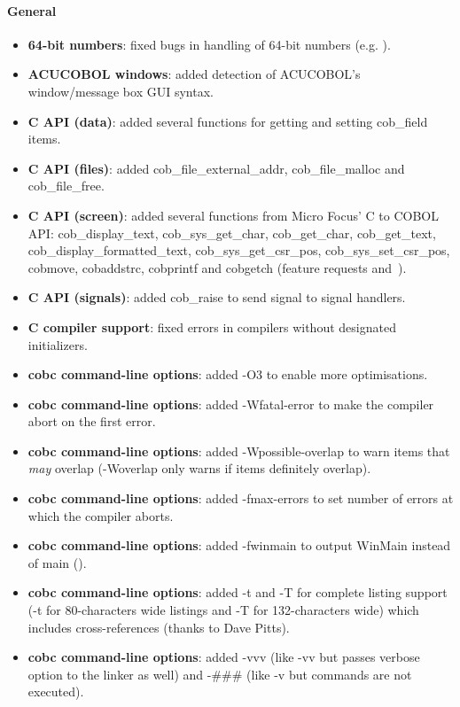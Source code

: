 \paragraph{General}
\begin{itemize}
\item \textbf{64-bit numbers}: fixed bugs in handling of 64-bit numbers (e.g. ).
\item \textbf{ACUCOBOL windows}: added detection of ACUCOBOL's window\slash{}message box GUI syntax.
\item \textbf{C API (data)}: added several functions for getting and setting cob\_field items.
\item \textbf{C API (files)}: added cob\_file\_external\_addr, cob\_file\_malloc and cob\_file\_free.
\item \textbf{C API (screen)}: added several functions from Micro Focus' C to COBOL API: cob\_display\_text, cob\_sys\_get\_char, cob\_get\_char, cob\_get\_text, cob\_display\_formatted\_text, cob\_sys\_get\_csr\_pos, cob\_sys\_set\_csr\_pos, cobmove, cobaddstrc, cobprintf and cobgetch (feature requests  and~).
\item \textbf{C API (signals)}: added cob\_raise to send signal to signal handlers.
\item \textbf{C compiler support}: fixed errors in compilers without designated initializers.
\item \textbf{cobc command-line options}: added -O3 to enable more optimisations.
\item \textbf{cobc command-line options}: added -Wfatal-error to make the compiler abort on the first error.
\item \textbf{cobc command-line options}: added -Wpossible-overlap to warn items that \emph{may} overlap (-Woverlap only warns if items definitely overlap).
\item \textbf{cobc command-line options}: added -fmax-errors to set number of errors at which the compiler aborts.
\item \textbf{cobc command-line options}: added -fwinmain to output WinMain instead of main ().
\item \textbf{cobc command-line options}: added -t and -T for complete listing support (-t for 80-characters wide listings and -T for 132-characters wide) which includes cross-references (thanks to Dave Pitts).
\item \textbf{cobc command-line options}: added -vvv (like -vv but passes verbose option to the linker as well) and -\#\#\# (like -v but commands are not executed).

\end{itemize}
